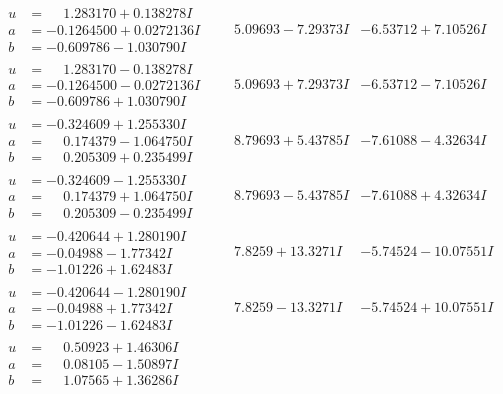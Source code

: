 \documentclass[1p]{elsarticle_modified}
\theoremstyle{definition}
\begin{document}
$$\begin{array}{c|c|c}
\begin{aligned}
u &= \phantom{-}1.283170 + 0.138278 I \\
a &= -0.1264500 + 0.0272136 I \\
b &= -0.609786 - 1.030790 I\end{aligned}
 & \phantom{-}5.09693 - 7.29373 I & -6.53712 + 7.10526 I \\ \hline\begin{aligned}
u &= \phantom{-}1.283170 - 0.138278 I \\
a &= -0.1264500 - 0.0272136 I \\
b &= -0.609786 + 1.030790 I\end{aligned}
 & \phantom{-}5.09693 + 7.29373 I & -6.53712 - 7.10526 I \\ \hline\begin{aligned}
u &= -0.324609 + 1.255330 I \\
a &= \phantom{-}0.174379 - 1.064750 I \\
b &= \phantom{-}0.205309 + 0.235499 I\end{aligned}
 & \phantom{-}8.79693 + 5.43785 I & -7.61088 - 4.32634 I \\ \hline\begin{aligned}
u &= -0.324609 - 1.255330 I \\
a &= \phantom{-}0.174379 + 1.064750 I \\
b &= \phantom{-}0.205309 - 0.235499 I\end{aligned}
 & \phantom{-}8.79693 - 5.43785 I & -7.61088 + 4.32634 I \\ \hline\begin{aligned}
u &= -0.420644 + 1.280190 I \\
a &= -0.04988 - 1.77342 I \\
b &= -1.01226 + 1.62483 I\end{aligned}
 & \phantom{-}7.8259 + 13.3271 I & -5.74524 - 10.07551 I \\ \hline\begin{aligned}
u &= -0.420644 - 1.280190 I \\
a &= -0.04988 + 1.77342 I \\
b &= -1.01226 - 1.62483 I\end{aligned}
 & \phantom{-}7.8259 - 13.3271 I & -5.74524 + 10.07551 I \\ \hline\begin{aligned}
u &= \phantom{-}0.50923 + 1.46306 I \\
a &= \phantom{-}0.08105 - 1.50897 I \\
b &= \phantom{-}1.07565 + 1.36286 I\end{aligned}

\end{array}$$
\end{document}

